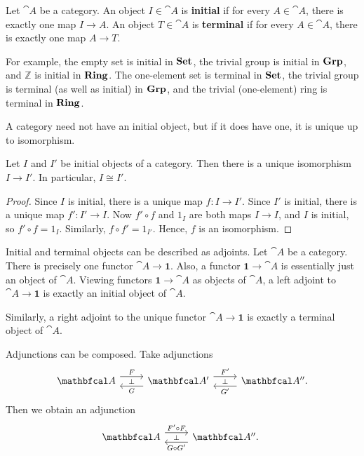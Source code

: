\documentclass[11pt,a4paper]{article}
\begin{document}
\begin{definition}
    Let $\cat{A}$ be a category. An object $I\in\cat{A}$ is \textbf{initial} if for every $A\in\cat{A}$, there is exactly one map $I\to A$. An object $T\in\cat{A}$ is \textbf{terminal} if for every $A\in\cat{A}$, there is exactly one map $A\to T$.
\end{definition}
    For example, the empty set is initial in $\mathbf{Set}$, the trivial group is initial in $\mathbf{Grp}$, and $\mathbb{Z}$ is initial in $\mathbf{Ring}$. The one-element set is terminal in $\mathbf{Set}$, the trivial group is terminal (as well as initial) in $\mathbf{Grp}$, and the trivial (one-element) ring is terminal in $\mathbf{Ring}$.\par
    A category need not have an initial object, but if it does have one, it is unique up to isomorphism.
\begin{lemma}
    Let $I$ and $I'$ be initial objects of a category. Then there is a unique isomorphism $I\to I'$. In particular, $I\cong I'$.
\end{lemma}
\begin{proof}
    Since $I$ is initial, there is a unique map $f: I\to I'$. Since $I'$ is initial, there is a unique map $f':I'\to I$. Now $f'\circ f$ and $1_I$ are both maps $I\to I$, and $I$ is initial, so $f'\circ f=1_I$. Similarly, $f\circ f'=1_{I'}$. Hence, $f$ is an isomorphism.
\end{proof}

\begin{example}
    Initial and terminal objects can be described as adjoints. Let $\cat{A}$ be a category. There is precisely one functor $\cat{A} \to \textbf{1}$. Also, a functor $ \textbf{1}\to\cat{A}$ is essentially just an object of $\cat{A}$. Viewing functors $ \textbf{1}\to\cat{A}$ as objects of $\cat{A}$, a left adjoint to $\cat{A}\to \textbf{1}$ is exactly an initial object of $\cat{A}$.\par
    Similarly, a right adjoint to the unique functor $\cat{A}\to \textbf{1}$ is exactly a terminal object of $\cat{A}$.
\end{example}

\begin{remark}
    Adjunctions can be composed. Take adjunctions
    \begin{equation*}
    \begin{tikzcd}
        \cat{A}
        \arrow[r, shift left=2, "F"] &
        \cat{A'}
        \arrow[l, shift left=2, "G", "\bot"'] \arrow[r, shift left=2, "F'"] &
        \cat{A''.}
        \arrow[l, shift left=2, "G'", "\bot"']
    \end{tikzcd}
    \end{equation*}
    Then we obtain an adjunction
    \begin{equation*}
    \begin{tikzcd}
        \cat{A} \arrow[r, shift left=2, "F'\circ F"] &
        \cat{A''.} \arrow[l, shift left=2, "G\circ G'", "\bot"'] \
    \end{tikzcd}
    \end{equation*}
\end{remark}
\end{document}
